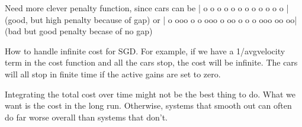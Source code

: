\documentclass[11pt]{article}
\begin{document}
\begin{multicols}{2}
Need more clever penalty function, since cars can be | o o o o o o o o o           o o o | (good, but high penalty because of gap) or | o ooo o o ooo o oo o o o ooo oo  oo| (bad but good penalty becase of no gap)

How to handle infinite cost for SGD. For example, if we have a 1/avgvelocity term in the cost function and all the cars stop, the cost will be infinite. The cars will all stop in finite time if the active gains are set to zero.

Integrating the total cost over time might not be the best thing to do. What we want is the cost in the long run. Otherwise, systems that smooth out can often do far worse overall than systems that don't.

\end{multicols}
\end{document}
